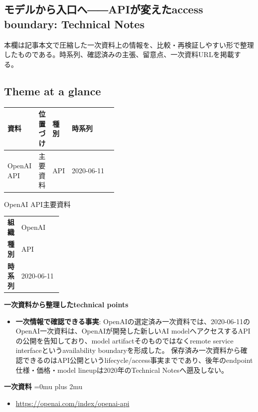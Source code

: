 \subsection*{モデルから入口へ――APIが変えたaccess boundary: Technical Notes}
本欄は記事本文で圧縮した一次資料上の情報を、比較・再検証しやすい形で整理したものである。時系列、確認済みの主張、留意点、一次資料URLを掲載する。
\smallskip
{}\par
\medskip
\subsection*{Theme at a glance}
\begin{center}
\footnotesize
\begin{tabularx}{\linewidth}{@{}p{0.20\linewidth}p{0.10\linewidth}p{0.14\linewidth}X@{}}
\toprule
資料 & 位置づけ & 種別 & 時系列 \\
\midrule
OpenAI API & 主要資料 & API & 2020-06-11 \\
\bottomrule
\end{tabularx}
\end{center}
\normalsize

\begin{technicalnote}{OpenAI API}{主要資料}
\begingroup
\begin{tabularx}{\linewidth}{@{}>{\bfseries}p{0.22\linewidth}X@{}}
組織 & OpenAI \\
種別 & API \\
時系列 & 2020-06-11 \\
\end{tabularx}
\smallskip
{\bfseries 一次資料から整理したtechnical points}
\begin{itemize}[leftmargin=1.5em,itemsep=0.35em]
\item \textbf{一次情報で確認できる事実}: OpenAIの選定済み一次資料では、2020-06-11のOpenAI一次資料は、OpenAIが開発した新しいAI modelへアクセスするAPIの公開を告知しており、model artifactそのものではなくremote service interfaceというavailability boundaryを形成した。 保存済み一次資料から確認できるのはAPI公開というlifecycle/access事実までであり、後年のendpoint仕様・価格・model lineupは2020年のTechnical Notesへ遡及しない。
\end{itemize}
\begin{minipage}{\linewidth}
\begin{samepage}
{\bfseries 一次資料}
\begingroup\sloppy
\Urlmuskip=0mu plus 2mu\relax
\begin{itemize}[leftmargin=1.5em,itemsep=0.25em]
\item {\scriptsize\url{https://openai.com/index/openai-api}}
\end{itemize}
\endgroup
\end{samepage}
\end{minipage}
\endgroup
\end{technicalnote}
\medskip
